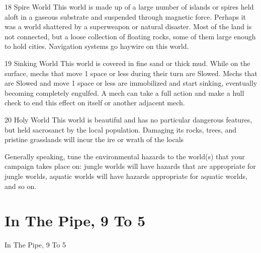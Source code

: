  18      Spire World                         This world is made up of a large number of islands or  
                                             spires held aloft in a gaseous substrate and suspended  
                                             through magnetic force. Perhaps it was a world  
                                             shattered by a superweapon or natural disaster. Most of  
                                             the land is not connected, but a loose collection of  
                                             floating rocks, some of them large enough to hold  
                                             cities. Navigation systems go haywire on this world. 

 19      Sinking World                       This world is covered in fine sand or thick mud. While  
                                             on the surface, mechs that move 1 space or less during  
                                             their turn are Slowed. Mechs that are Slowed and move  
                                             1 space or less are immobilized and start sinking,  
                                             eventually becoming completely engulfed. A mech can  
                                             take a full action and make a hull check to end this  
                                             effect on itself or another adjacent mech. 

 20      Holy World                          This world is beautiful and has no particular dangerous  
                                             features, but held sacrosanct by the local population.  
                                             Damaging its rocks, trees, and pristine grasslands will  
                                             incur the ire or wrath of the locals 

Generally speaking, tune the environmental hazards to the world(s) that your campaign takes  
place on: jungle worlds will have hazards that are appropriate for jungle worlds, aquatic worlds  
will have hazards appropriate for aquatic worlds, and so on. 
 

                                                                                                          
\section{In The Pipe, 9 To 5 }

In The Pipe, 9 To 5   

